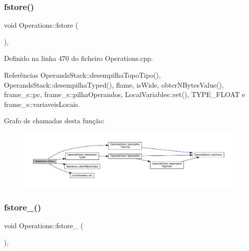 \subsubsection{\texorpdfstring{fstore()}{fstore()}}
{\footnotesize\ttfamily void Operations\+::fstore (\begin{DoxyParamCaption}{ }\end{DoxyParamCaption})\hspace{0.3cm}{\ttfamily [static]}, {\ttfamily [private]}}



Definido na linha 470 do ficheiro Operations.\+cpp.



Referências Operands\+Stack\+::desempilha\+Topo\+Tipo(), Operands\+Stack\+::desempilha\+Typed(), flame, is\+Wide, obter\+N\+Bytes\+Value(), frame\+\_\+s\+::pc, frame\+\_\+s\+::pilha\+Operandos, Local\+Variables\+::set(), T\+Y\+P\+E\+\_\+\+F\+L\+O\+AT e frame\+\_\+s\+::variaveis\+Locais.

Grafo de chamadas desta função\+:
\nopagebreak
\begin{figure}[H]
\begin{center}
\leavevmode
\includegraphics[width=350pt]{classOperations_a42a0b3220b593059320cf7d5a5eed6e2_cgraph}
\end{center}
\end{figure}
\mbox{\label{classOperations_a7465534bbf4e4ca9f0493a8dbe645d46}} 
\subsubsection{\texorpdfstring{fstore\+\_()}{fstore\_0()}}
{\footnotesize\ttfamily void Operations\+::fstore\+\_ (\begin{DoxyParamCaption}{ }\end{DoxyParamCaption})\hspace{0.3cm}{\ttfamily [static]}, {\ttfamily [private]}}



